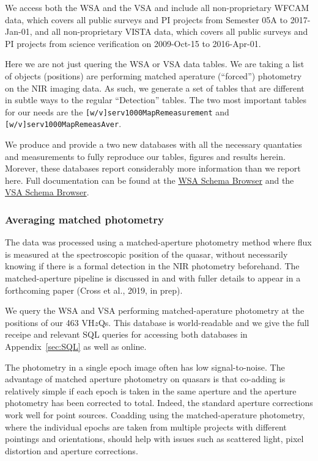 \documentclass[usenatbib]{mnras}
\begin{document}
We access both the WSA and the VSA and include all non-proprietary
WFCAM data, which covers all public surveys and PI projects from
Semester 05A to 2017-Jan-01, and all non-proprietary VISTA data, which
covers all public surveys and PI projects from science verification on
2009-Oct-15 to 2016-Apr-01.

Here we are not just quering the WSA or VSA data tables. We are taking
a list of objects (positions) are performing matched aperature
(``forced'') photometry on the NIR imaging data. As such, we generate
a set of tables that are different in subtle ways to the regular
``Detection'' tables.  The two most important tables for our needs are
the {\tt [w/v]serv1000MapRemeasurement} and {\tt
[w/v]serv1000MapRemeasAver}.

We produce and provide a two new databases with all the necessary
quantaties and measurements to fully reproduce our tables, figures and
results herein. Morever, these databases report considerably more
information than we report here. Full documentation can be found at
the \href{http://wsa.roe.ac.uk/www/wsa_browser.html}{WSA Schema
Browser} and the
\href{http://horus.roe.ac.uk/vsa/www/vsa_browser.html}{VSA Schema
Browser}.


  \subsubsection{Averaging matched photometry}
  The data was processed using a matched-aperture photometry method
  where flux is measured at the spectroscopic position of the quasar,
  without necessarily knowing if there is a formal detection in the NIR
  photometry beforehand. The matched-aperture pipeline is discussed in
  \citet{Cross2013} and with fuller details to appear in a forthcoming
  paper (Cross et al., 2019, in prep).
  
  We query the WSA and VSA performing matched-aperature photometry at
  the positions of our 463 VH$z$Qs. This database is world-readable and
  we give the full receipe and relevant SQL queries for accessing both
  databases in Appendix~\ref{sec:SQL} as well as online. 
  
  The photometry in a single epoch image often has low
  signal-to-noise.  The advantage of matched aperture photometry on
  quasars is that co-adding is relatively simple if each epoch is taken
  in the same aperture and the aperture photometry has been corrected to
  total. Indeed, the standard aperture corrections work well for point
  sources. Coadding using the matched-aperature photometry, where the
  individual epochs are taken from multiple projects with different
  pointings and orientations, should help with issues such as scattered
  light, pixel distortion and aperture corrections.
    
\end{document}
